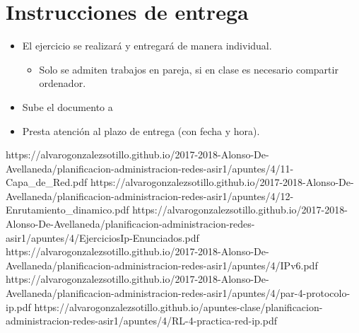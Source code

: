 \section{Instrucciones de entrega}
\begin{itemize}
\item El ejercicio se realizará y entregará de manera
  individual.
  \begin{itemize}
  \item Solo se admiten trabajos en pareja, si en clase es necesario compartir ordenador.
  \end{itemize}
\item Sube el documento a 
\item Presta atención al plazo de entrega (con fecha y hora).
\end{itemize}








https://alvarogonzalezsotillo.github.io/2017-2018-Alonso-De-Avellaneda/planificacion-administracion-redes-asir1/apuntes/4/11-Capa_de_Red.pdf
https://alvarogonzalezsotillo.github.io/2017-2018-Alonso-De-Avellaneda/planificacion-administracion-redes-asir1/apuntes/4/12-Enrutamiento_dinamico.pdf
https://alvarogonzalezsotillo.github.io/2017-2018-Alonso-De-Avellaneda/planificacion-administracion-redes-asir1/apuntes/4/EjerciciosIp-Enunciados.pdf
https://alvarogonzalezsotillo.github.io/2017-2018-Alonso-De-Avellaneda/planificacion-administracion-redes-asir1/apuntes/4/IPv6.pdf
https://alvarogonzalezsotillo.github.io/2017-2018-Alonso-De-Avellaneda/planificacion-administracion-redes-asir1/apuntes/4/par-4-protocolo-ip.pdf
https://alvarogonzalezsotillo.github.io/apuntes-clase/planificacion-administracion-redes-asir1/apuntes/4/RL-4-practica-red-ip.pdf
